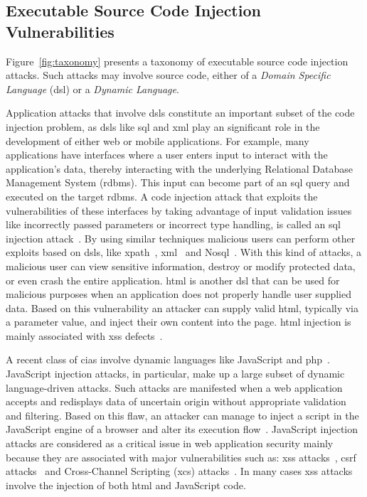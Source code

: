 \documentclass[conference]{IEEEtran}
\begin{document}
\subsection{Executable Source Code Injection Vulnerabilities}

Figure~\ref{fig:taxonomy} presents a taxonomy of executable source
code injection attacks. Such attacks may involve source code, either of a
{\it Domain Specific Language} ({\sc dsl}) or a {\it Dynamic Language}.

Application attacks that involve {\sc dsl}s constitute an important
subset of the code injection problem, as {\sc dsl}s like {\sc sql} and
{\sc xml} play an significant role in the development of either web or
mobile applications. For example, many applications have interfaces
where a user enters input to interact with the application's data,
thereby interacting with the underlying Relational Database Management
System ({\sc rdbms}). This input can become part of an {\sc sql} query
and executed on the target {\sc rdbms}. A code injection attack that
exploits the vulnerabilities of these interfaces by taking advantage
of input validation issues like incorrectly passed parameters or
incorrect type handling, is called an {\sc sql} injection
attack~\cite{CERT02,MS09,HVO06,SW06}. By using similar techniques
malicious users can perform other exploits based on {\sc dsl}s,
like {\sc xp}ath~\cite{SW06,CDL07,MKS09}, {\sc xml}~\cite{MSM13}
and No{\sc sql}~\cite{SMS13}. With this kind of attacks,
a malicious user can view sensitive information,
destroy or modify protected data, or even crash the entire
application. {\sc html} is another {\sc dsl} that can be used
for malicious purposes when an application does not properly
handle user supplied data. Based on this vulnerability
an attacker can supply valid {\sc html},
typically via a parameter value, and inject their own
content into the page. {\sc html} injection is mainly associated
with {\sc xss} defects~\cite{HNSHS12}.

A recent class of {\sc cia}s involve dynamic languages like
JavaScript and {\sc php}~\cite{SFVM09,EWKK09,SMS13}. JavaScript
injection attacks, in particular, make up a large subset of dynamic
language-driven attacks. Such attacks are manifested when a web
application accepts and redisplays data of uncertain origin without
appropriate validation and filtering. Based on this flaw, an attacker
can manage to inject a script in the JavaScript engine of a browser
and alter its execution flow~\cite{ELX07}. JavaScript injection
attacks are considered as a critical issue in web application security
mainly because they are associated with major vulnerabilities such as:
{\sc xss} attacks~\cite{SG07}, {\sc csrf} attacks~\cite{BJM08,LZRL09} and
Cross-Channel Scripting ({\sc xcs}) attacks~\cite{W10,BBB09}.
In many cases {\sc xss} attacks involve the injection of
both {\sc html} and JavaScript code.
\end{document}
